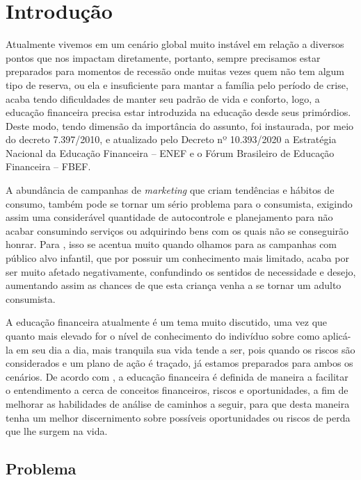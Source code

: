 \chapter{Introdução}

    Atualmente vivemos em um cenário global muito instável em relação a diversos pontos que nos impactam diretamente,
    portanto, sempre precisamos estar preparados para momentos de recessão onde muitas vezes quem não tem algum tipo de
    reserva, ou ela e insuficiente para mantar a família pelo período de crise, acaba tendo dificuldades de manter seu
    padrão de vida e conforto, logo, a educação financeira precisa estar introduzida na educação desde seus primórdios.
    Deste modo, tendo dimensão da importância do assunto, foi instaurada, por meio do decreto 7.397/2010, e atualizado
    pelo Decreto nº 10.393/2020 a Estratégia Nacional da Educação Financeira -- ENEF e o Fórum Brasileiro de Educação
    Financeira -- FBEF.\cite{decreto_10939}

    A abundância de campanhas de \textit{marketing} que criam tendências e hábitos de consumo, também pode se tornar um
    sério problema para o consumista, exigindo assim uma considerável quantidade de autocontrole e planejamento para não
    acabar consumindo serviços ou adquirindo bens com os quais não se conseguirão honrar.
    Para , isso se acentua muito quando olhamos para as campanhas
    com público alvo infantil, que por possuir um conhecimento mais limitado, acaba por ser muito afetado negativamente,
    confundindo os sentidos de necessidade e desejo, aumentando assim as chances de que esta criança venha a se tornar
    um adulto consumista.

    A educação financeira atualmente é um tema muito discutido, uma vez que quanto mais elevado for o nível de
    conhecimento do indivíduo sobre como aplicá-la em seu dia a dia, mais tranquila sua vida tende a ser, pois quando os
    riscos são considerados e um plano de ação é traçado, já estamos preparados para ambos os cenários. De acordo com
    , a educação financeira é definida de maneira a facilitar o entendimento a cerca de conceitos
    financeiros, riscos e oportunidades, a fim de melhorar as habilidades de análise de caminhos a seguir, para que
    desta maneira tenha um melhor discernimento sobre possíveis oportunidades ou riscos de perda que lhe surgem na vida.

    \section{Problema}

